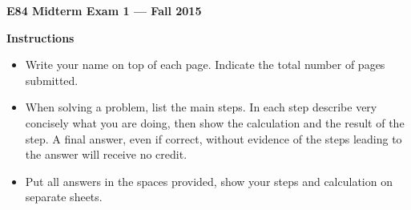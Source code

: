 \documentclass[11pt]{article}
\begin{document}
\begin{center}
{\Large \bf  E84 Midterm Exam 1 --- Fall 2015}
\end{center}

{\bf Instructions}
\begin{itemize}
\item Write your name on top of each page. Indicate the total number of 
  pages submitted.
\item When solving a problem, list the main steps. In each step describe 
  very concisely what you are doing, then show the calculation and the 
  result of the step. A final answer, even if correct, without evidence 
  of the steps leading to the answer will receive no credit. 
\item Put all answers in the spaces provided, show your steps and 
  calculation on separate sheets.
\end{itemize}

\newpage
\end{document}
